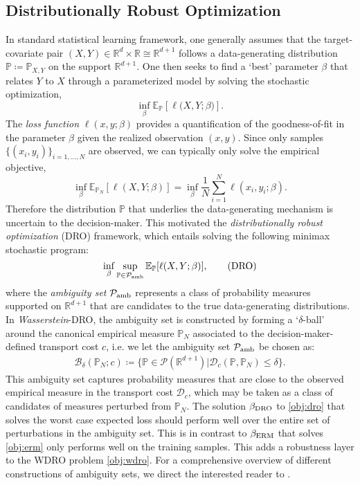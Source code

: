 \documentclass[12pt]{article}
\begin{document}
\subsection{Distributionally Robust Optimization}
In standard statistical learning framework, one generally assumes that the target-covariate pair $(X,Y)\in \mathbb{R}^d\times \mathbb{R} \cong\mathbb{R}^{d+1}$ follows a data-generating distribution $\mathbb{P} \coloneqq \mathbb{P}_{X,Y}$ on the support $\mathbb{R}^{d+1}$. One then seeks to find a `best' parameter $\beta$ that relates $Y$ to $X$ through a parameterized model by solving the stochastic optimization, \[
\inf_{\beta} \mathbb{E}_{\mathbb{P}}\left[\ell{(X,Y;\beta}) \right]. \tag{SO}\label{obj:so}
\]The \textit{loss function} $\ell{(x,y;\beta)}$ provides a quantification of the goodness-of-fit in the parameter $\beta$ given the realized observation $(x,y)$. Since only samples $\{(x_i,y_i)\}_{i=1,\ldots,N}$ are observed, we can typically only solve the empirical objective, \[
\inf_\beta \mathbb{E}_{\mathbb{P}_N}[\ell(X,Y;\beta)] = \inf_\beta \dfrac{1}{N}\sum_{i=1}^N \ell(x_i,y_i;\beta).\tag{ERM}\label{obj:erm}
\]Therefore the distribution $\mathbb{P}$ that underlies the data-generating mechanism is uncertain to the decision-maker. This motivated the \textit{distributionally robust optimization} (DRO) framework, which entails solving the following minimax stochastic program:\[
\inf_{\beta}\sup_{\mathbb{P}\in \mathcal{P}_{\rm amb}} \mathbb{E}_\mathbb{P} [\ell(X,Y;\beta)], \tag{\rm DRO}\label{obj:dro}
\]where the \textit{ambiguity set} $\mathcal{P}_{\rm amb}$ represents a class of probability measures supported on $\mathbb{R}^{d+1}$ that are candidates to the true data-generating distributions. In \textit{Wasserstein}-DRO, the ambiguity set is constructed by forming a `$\delta$-ball' around the canonical empirical measure $\mathbb{P}_N$ associated to the decision-maker-defined transport cost $c$, i.e. we let the ambiguity set $\mathcal{P}_{\rm amb}$ be chosen as: \begin{align*}
    \mathcal{B}_\delta (\mathbb{P}_N;c)\coloneqq  \{\mathbb{P}\in \mathcal{P}(\mathbb{R}^{d+1})| \mathcal{D}_c(\mathbb{P},\mathbb{P}_N)\leq \delta\}. \tag{WDRO} \label{obj:wdro}
\end{align*}
This ambiguity set captures probability measures that are close to the observed empirical measure in the transport cost $\mathcal{D}_c$, which may be taken as a class of candidates of measures perturbed from $\mathbb{P}_N$. The solution $\beta_{\rm DRO}$ to \eqref{obj:dro} that solves the worst case expected loss should perform well over the entire set of perturbations in the ambiguity set. This is in contrast to $\beta_{\rm ERM}$ that solves \eqref{obj:erm} only performs well on the training samples. This adds a robustness layer to the WDRO problem \eqref{obj:wdro}. For a comprehensive overview of different constructions of ambiguity sets, we direct the interested reader to \citep[Section 2]{kuhn2024dro}.
\end{document}
